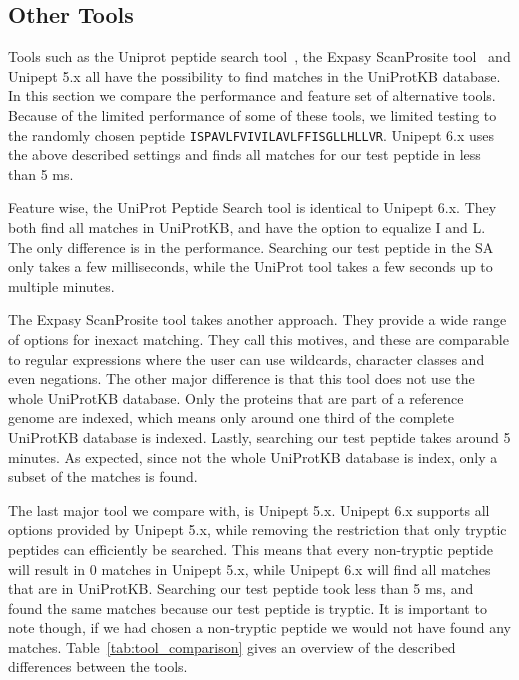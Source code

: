 \documentclass[11pt]{article}
\begin{document}
\begin{multicols}{2}
        \section{Other Tools}\label{sec:comparison}
        Tools such as the Uniprot peptide search tool~\cite{uniprot_search_site, uniprot_search_paper}, the Expasy ScanProsite tool~\cite{scanprosite} and Unipept 5.x all have the possibility to find matches in the UniProtKB database.
        In this section we compare the performance and feature set of alternative tools.
        Because of the limited performance of some of these tools, we limited testing to the randomly chosen peptide \texttt{ISPAVLFVIVILAVLFFISGLLHLLVR}.
        Unipept 6.x uses the above described settings and finds all matches for our test peptide in less than 5 ms.

        Feature wise, the UniProt Peptide Search tool is identical to Unipept 6.x.
        They both find all matches in UniProtKB, and have the option to equalize I and L\@.
        The only difference is in the performance.
        Searching our test peptide in the SA only takes a few milliseconds, while the UniProt tool takes a few seconds up to multiple minutes.

        The Expasy ScanProsite tool takes another approach.
        They provide a wide range of options for inexact matching.
        They call this motives, and these are comparable to regular expressions where the user can use wildcards, character classes and even negations.
        The other major difference is that this tool does not use the whole UniProtKB database.
        Only the proteins that are part of a reference genome are indexed, which means only around one third of the complete UniProtKB database is indexed.
        Lastly, searching our test peptide takes around 5 minutes.
        As expected, since not the whole UniProtKB database is index, only a subset of the matches is found.

        The last major tool we compare with, is Unipept 5.x.
        Unipept 6.x supports all options provided by Unipept 5.x, while removing the restriction that only tryptic peptides can efficiently be searched.
        This means that every non-tryptic peptide will result in 0 matches in Unipept 5.x, while Unipept 6.x will find all matches that are in UniProtKB\@.
        Searching our test peptide took less than 5 ms, and found the same matches because our test peptide is tryptic.
        It is important to note though, if we had chosen a non-tryptic peptide we would not have found any matches.
        Table~\ref{tab:tool_comparison} gives an overview of the described differences between the tools.


\end{multicols}
\end{document}
